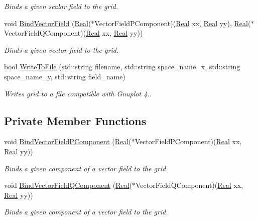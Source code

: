 \begin{DoxyCompactItemize}
\begin{DoxyCompactList}\small\item\em Binds a given scalar field to the grid. \end{DoxyCompactList}\item 
void \hyperlink{classmtk_1_1UniStgGrid2D_a1cba89c285973514c1351760d598c52b}{Bind\+Vector\+Field} (\hyperlink{group__c01-roots_gac080bbbf5cbb5502c9f00405f894857d}{Real}($\ast$Vector\+Field\+P\+Component)(\hyperlink{group__c01-roots_gac080bbbf5cbb5502c9f00405f894857d}{Real} xx, \hyperlink{group__c01-roots_gac080bbbf5cbb5502c9f00405f894857d}{Real} yy), \hyperlink{group__c01-roots_gac080bbbf5cbb5502c9f00405f894857d}{Real}($\ast$Vector\+Field\+Q\+Component)(\hyperlink{group__c01-roots_gac080bbbf5cbb5502c9f00405f894857d}{Real} xx, \hyperlink{group__c01-roots_gac080bbbf5cbb5502c9f00405f894857d}{Real} yy))
\begin{DoxyCompactList}\small\item\em Binds a given vector field to the grid. \end{DoxyCompactList}\item 
bool \hyperlink{classmtk_1_1UniStgGrid2D_a3507e3cf41631e5a5801af8ee6e233b0}{Write\+To\+File} (std\+::string filename, std\+::string space\+\_\+name\+\_\+x, std\+::string space\+\_\+name\+\_\+y, std\+::string field\+\_\+name)
\begin{DoxyCompactList}\small\item\em Writes grid to a file compatible with Gnuplot 4.. \end{DoxyCompactList}\end{DoxyCompactItemize}
\subsection*{Private Member Functions}
\begin{DoxyCompactItemize}
\item 
void \hyperlink{classmtk_1_1UniStgGrid2D_a5ff685fde27134437dd0b372fb6b9958}{Bind\+Vector\+Field\+P\+Component} (\hyperlink{group__c01-roots_gac080bbbf5cbb5502c9f00405f894857d}{Real}($\ast$Vector\+Field\+P\+Component)(\hyperlink{group__c01-roots_gac080bbbf5cbb5502c9f00405f894857d}{Real} xx, \hyperlink{group__c01-roots_gac080bbbf5cbb5502c9f00405f894857d}{Real} yy))
\begin{DoxyCompactList}\small\item\em Binds a given component of a vector field to the grid. \end{DoxyCompactList}\item 
void \hyperlink{classmtk_1_1UniStgGrid2D_a8b7ae23231a4a694073b6c22715a4375}{Bind\+Vector\+Field\+Q\+Component} (\hyperlink{group__c01-roots_gac080bbbf5cbb5502c9f00405f894857d}{Real}($\ast$Vector\+Field\+Q\+Component)(\hyperlink{group__c01-roots_gac080bbbf5cbb5502c9f00405f894857d}{Real} xx, \hyperlink{group__c01-roots_gac080bbbf5cbb5502c9f00405f894857d}{Real} yy))
\begin{DoxyCompactList}\small\item\em Binds a given component of a vector field to the grid. \end{DoxyCompactList}\end{DoxyCompactItemize}
